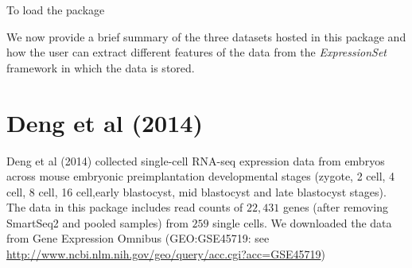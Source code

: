 \documentclass[12pt]{article}
\begin{document}
To load the package

\begin{knitrout}
\color{fgcolor}\begin{kframe}
\begin{alltt}
\end{alltt}
\end{kframe}
\end{knitrout}

We now provide a brief summary of the three datasets hosted in this package and
how the user can extract different features of the data from the
\textit{ExpressionSet} framework in which the data is stored.

\section{Deng et al (2014)}

Deng et al (2014) \cite{Deng2014} collected single-cell RNA-seq expression data from embryos across mouse embryonic preimplantation developmental stages (zygote, 2 cell,
4 cell, 8 cell, 16 cell,early blastocyst, mid blastocyst and late blastocyst
stages). The data in this package includes read counts of $22,431$ genes (after removing SmartSeq2 and pooled samples) from $259$ single cells. We downloaded the data from Gene Expression Omnibus
(GEO:GSE45719: see \url{http://www.ncbi.nlm.nih.gov/geo/query/acc.cgi?acc=GSE45719})
\end{document}
